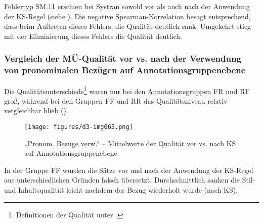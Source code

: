 Fehlertyp SM.11 erschien bei Systran sowohl vor als auch nach der Anwendung der KS-Regel (siehe ). Die negative Spearman-Korrelation besagt entsprechend, dass beim Auftreten dieses Fehlers, die Qualität deutlich sank. Umgekehrt stieg mit der Eliminierung dieses Fehlers die Qualität deutlich.

\subsubsection{\label{sec:5.3.4.5}Vergleich der MÜ-Qualität vor vs. nach der Verwendung von pronominalen Bezügen auf Annotationsgruppenebene}
\largerpage
Die Qualitätsunterschiede\footnote{\textrm{Definitionen der Qualität unter .}} waren nur bei den Annotationsgruppen FR und RF groß, während bei den Gruppen FF und RR das Qualitätsniveau relativ vergleichbar blieb ().


\begin{figure}
\texttt{[image: figures/d3-img065.png]}
\caption{\label{fig:05:70}„Pronom. Bezüge verw.“ -- Mittelwerte der Qualität vor vs. nach KS auf Annotationsgruppenebene   }
\end{figure}

In der Gruppe FF wurden die Sätze vor und nach der Anwendung der KS-Regel aus unterschiedlichen Gründen falsch übersetzt. Durchschnittlich sanken die Stil- und Inhaltsqualität leicht nachdem der Bezug wiederholt wurde (nach KS).


